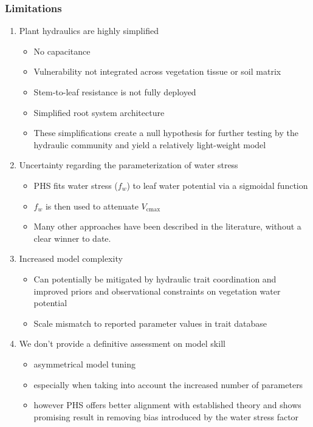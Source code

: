 \documentclass[draft,linenumbers]{agujournal}
\begin{document}
\subsubsection{Limitations}
\begin{enumerate}
    \item Plant hydraulics are highly simplified
    \begin{itemize}
        \item No capacitance
        \item Vulnerability not integrated across vegetation tissue or soil matrix
        \item Stem-to-leaf resistance is not fully deployed
        \item Simplified root system architecture
        \item These simplifications create a null hypothesis for further testing by the hydraulic community and yield a relatively light-weight model
    \end{itemize}
    \item Uncertainty regarding the parameterization of water stress
    \begin{itemize}
        \item PHS fits water stress ($f_w$) to leaf water potential via a sigmoidal function
        \item $f_w$ is then used to attenuate $V_{\text{cmax}}$
        \item Many other approaches have been described in the literature, without a clear winner to date.
    \end{itemize}
    \item Increased model complexity
    \begin{itemize}
    	\item Can potentially be mitigated by hydraulic trait coordination and improved priors and observational constraints on vegetation water potential
        \item Scale mismatch to reported parameter values in trait database 
    \end{itemize}
    \item We don't provide a definitive assessment on model skill
    \begin{itemize}
        \item asymmetrical model tuning
        \item especially when taking into account the increased number of parameters
        \item however PHS offers better alignment with established theory and shows promising result in removing bias introduced by the water stress factor
    \end{itemize}
    
\end{enumerate}
\end{document}
